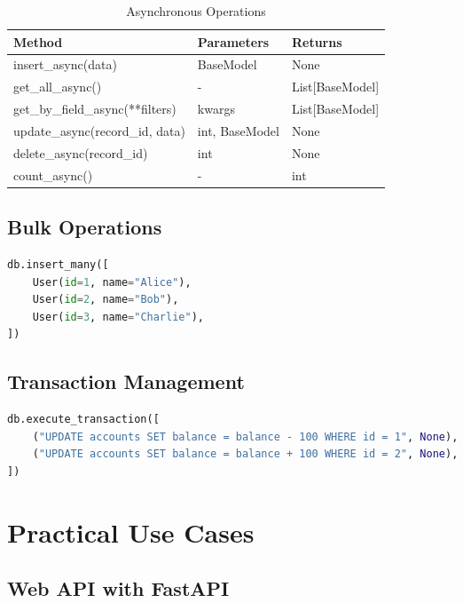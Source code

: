 \documentclass[12pt,a4paper]{report}
\begin{document}
\begin{table}[H]
	\centering
	\caption{Asynchronous Operations}
	\begin{tabular}{@{}lll@{}}
		\toprule
		\textbf{Method}                  & \textbf{Parameters} & \textbf{Returns} \\
		\midrule
		insert\_async(data)              & BaseModel           & None             \\
		get\_all\_async()                & -                   & List[BaseModel]  \\
		get\_by\_field\_async(**filters) & kwargs              & List[BaseModel]  \\
		update\_async(record\_id, data)  & int, BaseModel      & None             \\
		delete\_async(record\_id)        & int                 & None             \\
		count\_async()                   & -                   & int              \\
		\bottomrule
	\end{tabular}
\end{table}

\section{Bulk Operations}

\begin{lstlisting}[language=Python, caption=Bulk Insert Example]
db.insert_many([
    User(id=1, name="Alice"),
    User(id=2, name="Bob"),
    User(id=3, name="Charlie"),
])
\end{lstlisting}

\section{Transaction Management}

\begin{lstlisting}[language=Python, caption=Transaction Example]
db.execute_transaction([
    ("UPDATE accounts SET balance = balance - 100 WHERE id = 1", None),
    ("UPDATE accounts SET balance = balance + 100 WHERE id = 2", None),
])
\end{lstlisting}

\chapter{Practical Use Cases}

\section{Web API with FastAPI}
\end{document}

